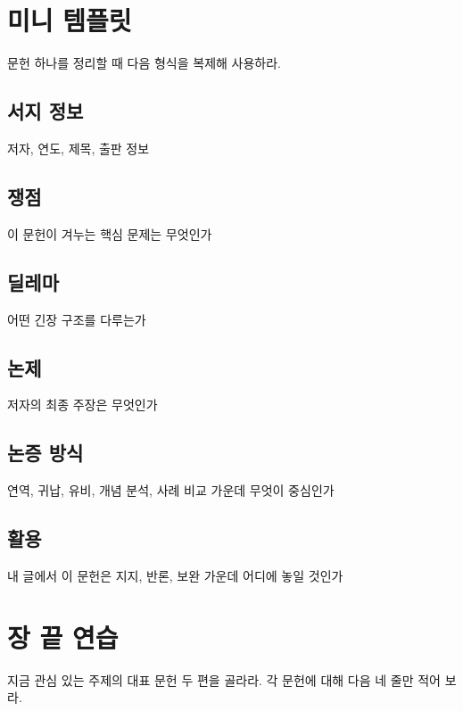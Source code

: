 \section{미니 템플릿}\label{uxbbf8uxb2c8-uxd15cuxd50cuxb9bf}

문헌 하나를 정리할 때 다음 형식을 복제해 사용하라.

\subsection{서지 정보}\label{uxc11cuxc9c0-uxc815uxbcf4}

저자, 연도, 제목, 출판 정보

\subsection{쟁점}\label{uxc7c1uxc810}

이 문헌이 겨누는 핵심 문제는 무엇인가

\subsection{딜레마}\label{uxb51cuxb808uxb9c8-1}

어떤 긴장 구조를 다루는가

\subsection{논제}\label{uxb17cuxc81c}

저자의 최종 주장은 무엇인가

\subsection{논증 방식}\label{uxb17cuxc99d-uxbc29uxc2dd}

연역, 귀납, 유비, 개념 분석, 사례 비교 가운데 무엇이 중심인가

\subsection{활용}\label{uxd65cuxc6a9}

내 글에서 이 문헌은 지지, 반론, 보완 가운데 어디에 놓일 것인가

\section{장 끝 연습}\label{uxc7a5-uxb05d-uxc5f0uxc2b5-5}

지금 관심 있는 주제의 대표 문헌 두 편을 골라라. 각 문헌에 대해 다음 네 줄만 적어 보라.

